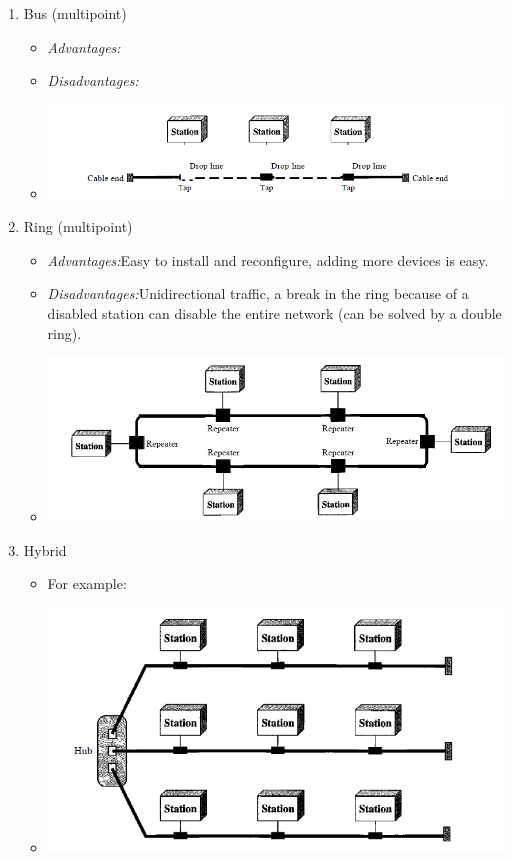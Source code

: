 \documentclass[12pt,a4paper]{report}
\begin{document}
\begin{itemize}
\begin{enumerate}
\item Bus (multipoint)
\begin{itemize}
\item\textit{Advantages:}
\item\textit{Disadvantages:}
\item \includegraphics[scale=0.7]{bus}
\end{itemize}

\item Ring (multipoint)
\begin{itemize}
\item\textit{Advantages:}Easy to install and reconfigure, adding more devices is easy.
\item\textit{Disadvantages:}Unidirectional traffic, a break in the ring because of a disabled station can disable the entire network (can be solved by a double ring).
\item \includegraphics[scale=0.7]{ring}
\end{itemize}

\item Hybrid
\begin{itemize}
\item For example:
\item \includegraphics[scale=0.7]{hybrid}
\end{itemize}

\end{enumerate}
\end{itemize}
\end{document}
